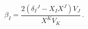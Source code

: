 \begin{equation}
\beta_I = \frac{2(\delta_I{}^J - X_I X^J)V_J}{X^K V_K}\,. \label{betafct}
\end{equation}

